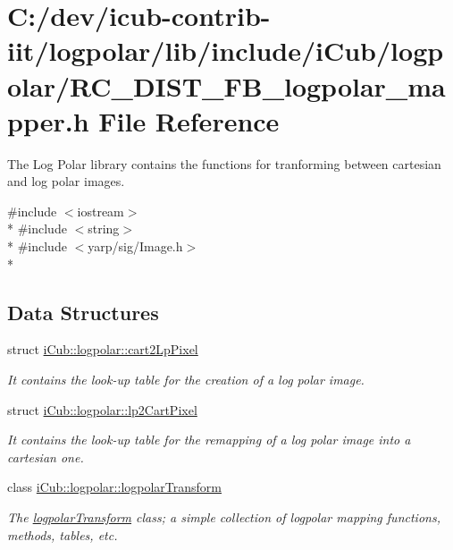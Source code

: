 \section{C\+:/dev/icub-\/contrib-\/iit/logpolar/lib/include/i\+Cub/logpolar/\+R\+C\+\_\+\+D\+I\+S\+T\+\_\+\+F\+B\+\_\+logpolar\+\_\+mapper.h File Reference}
\label{RC__DIST__FB__logpolar__mapper_8h}


The Log Polar library contains the functions for tranforming between cartesian and log polar images.  


{\ttfamily \#include $<$iostream$>$}\\*
{\ttfamily \#include $<$string$>$}\\*
{\ttfamily \#include $<$yarp/sig/\+Image.\+h$>$}\\*
\subsection*{Data Structures}
\begin{DoxyCompactItemize}
\item 
struct \hyperlink{structiCub_1_1logpolar_1_1cart2LpPixel}{i\+Cub\+::logpolar\+::cart2\+Lp\+Pixel}
\begin{DoxyCompactList}\small\item\em It contains the look-\/up table for the creation of a log polar image. \end{DoxyCompactList}\item 
struct \hyperlink{structiCub_1_1logpolar_1_1lp2CartPixel}{i\+Cub\+::logpolar\+::lp2\+Cart\+Pixel}
\begin{DoxyCompactList}\small\item\em It contains the look-\/up table for the remapping of a log polar image into a cartesian one. \end{DoxyCompactList}\item 
class \hyperlink{classiCub_1_1logpolar_1_1logpolarTransform}{i\+Cub\+::logpolar\+::logpolar\+Transform}
\begin{DoxyCompactList}\small\item\em The \hyperlink{classiCub_1_1logpolar_1_1logpolarTransform}{logpolar\+Transform} class; a simple collection of logpolar mapping functions, methods, tables, etc. \end{DoxyCompactList}\end{DoxyCompactItemize}
